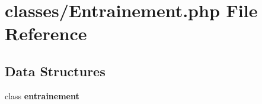 \section{classes/\+Entrainement.php File Reference}
\label{_entrainement_8php}
\subsection*{Data Structures}
\begin{DoxyCompactItemize}
\item 
class \textbf{ entrainement}
\end{DoxyCompactItemize}
